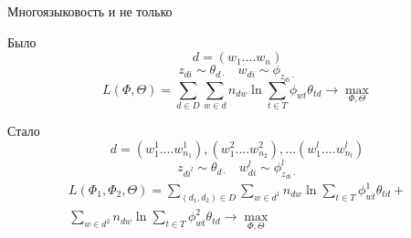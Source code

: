 \documentclass{beamer}
\begin{document}
\begin{frame}{Многоязыковость и не только}
\begin{block}{Было}
$$d = (w_1 .... w_n )$$
$$z_{di} \sim \theta_{d \cdot} ~~~~ w_{di} \sim \phi_{z_{di} \cdot }$$
$$L(\Phi, \Theta) = \sum\limits_{d \in D} \sum\limits_{w \in d} 
	n_{dw} \ln \sum\limits_{t \in T} \phi_{wt}\theta_{td} \rightarrow \max\limits_{\Phi, \Theta}$$
\end{block}

\begin{block}{Стало}
$$d = (w^1_1 .... w^1_{n_1} ), (w^2_1 .... w^2_{n_2} ) , ... (w^l_1 .... w^l_{n_l} ) $$
$$z_{di^l} \sim \theta_{d \cdot} ~~~~ w_{di}^l \sim \phi_{z_{di} \cdot }^l$$
\begin{equation*}
\begin{split}
L(\Phi_1, \Phi_2, \Theta) = \sum\limits_{(d_1,d_2) \in D}  \sum\limits_{w \in d^1} 
	n_{dw} \ln \sum\limits_{t \in T} \phi^1_{wt}\theta_{td} + \\
	\sum\limits_{w \in d^2} 
	n_{dw} \ln \sum\limits_{t \in T} \phi^2_{wt}\theta_{td}  \rightarrow \max\limits_{\Phi, \Theta}
\end{split}
\end{equation*}
\end{block}
\end{frame}
\end{document}
